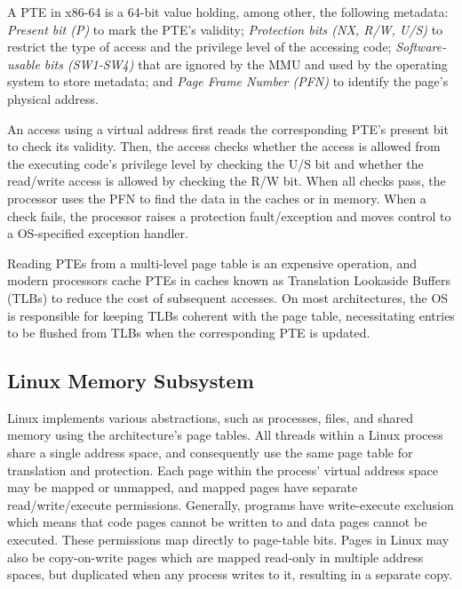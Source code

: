 \documentclass[letterpaper,twocolumn,10pt, anonymous]{article}
\begin{document}
A PTE in x86-64 is a 64-bit value holding, among other, the following metadata:
\emph{Present bit (P)} to mark the PTE's validity;
\emph{Protection bits (NX, R/W, U/S)} to restrict the type of
access and the privilege level of the accessing code;
\emph{Software-usable bits (SW1-SW4)} that are ignored by the MMU and used by the 
operating system to store metadata; and
\emph{Page Frame Number (PFN)} to identify the page's physical address.

An access using a virtual address first reads the corresponding PTE's 
present bit to check its validity. 
Then, the access checks whether the access is allowed from the executing
code's privilege level by checking the U/S bit and whether the 
read/write access is allowed by checking the R/W bit.
When all checks pass, the processor uses the PFN to find the data in 
the caches or in memory.
When a check fails, the processor raises a protection fault/exception and
moves control to a OS-specified exception handler.

Reading PTEs from a multi-level page table is an expensive operation, and 
modern processors cache PTEs in caches known as Translation Lookaside 
Buffers (TLBs) to reduce the cost of subsequent accesses. 
On most architectures, the OS is responsible for keeping TLBs coherent with 
the page table, necessitating entries to be flushed from TLBs when the 
corresponding PTE is updated.


\subsection{Linux Memory Subsystem}

Linux implements various abstractions, such as processes, files, and shared
memory using the architecture's page tables.
All threads within a Linux process share a single address space, and 
consequently use the same page table for translation and protection.
Each page within the process' virtual address space may be mapped or 
unmapped, and mapped pages have separate read/write/execute permissions.
Generally, programs have write-execute exclusion which means that 
code pages cannot be written to and data pages cannot be executed.
These permissions map directly to page-table bits.
Pages in Linux may also be copy-on-write pages which are mapped read-only
in multiple address spaces, but duplicated when any process writes
to it, resulting in a separate copy.
\end{document}
